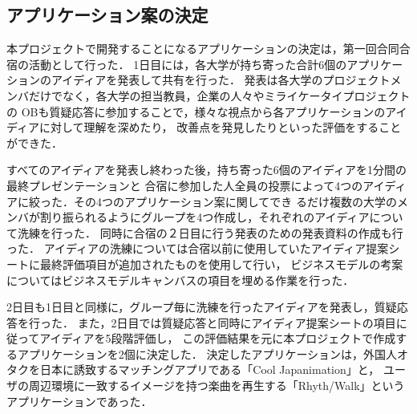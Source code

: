\subsection{アプリケーション案の決定}

\par
本プロジェクトで開発することになるアプリケーションの決定は，第一回合同合宿の活動として行った．
1日目には，各大学が持ち寄った合計6個のアプリケーションのアイディアを発表して共有を行った．
発表は各大学のプロジェクトメンバだけでなく，各大学の担当教員，企業の人々やミライケータイプロジェクトの
OBも質疑応答に参加することで，様々な視点から各アプリケーションのアイディアに対して理解を深めたり，
改善点を発見したりといった評価をすることができた．

\par
すべてのアイディアを発表し終わった後，持ち寄った6個のアイディアを1分間の最終プレゼンテーションと
合宿に参加した人全員の投票によって4つのアイディアに絞った．その4つのアプリケーション案に関してでき
るだけ複数の大学のメンバが割り振られるようにグループを4つ作成し，それぞれのアイディアについて洗練を行った．
同時に合宿の２日目に行う発表のための発表資料の作成も行った．
アイディアの洗練については合宿以前に使用していたアイディア提案シートに最終評価項目が追加されたものを使用して行い，
ビジネスモデルの考案についてはビジネスモデルキャンバスの項目を埋める作業を行った．

\par
2日目も1日目と同様に，グループ毎に洗練を行ったアイディアを発表し，質疑応答を行った．
また，2日目では質疑応答と同時にアイディア提案シートの項目に従ってアイディアを5段階評価し，
この評価結果を元に本プロジェクトで作成するアプリケーションを2個に決定した．
決定したアプリケーションは，外国人オタクを日本に誘致するマッチングアプリである「Cool Japanimation」と，
ユーザの周辺環境に一致するイメージを持つ楽曲を再生する「Rhyth/Walk」というアプリケーションであった．
